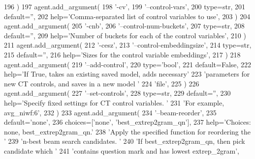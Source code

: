 \begin{DoxyCode}
196         )
197         agent.add\_argument(
198             \textcolor{stringliteral}{'-cv'},
199             \textcolor{stringliteral}{'--control-vars'},
200             type=str,
201             default=\textcolor{stringliteral}{''},
202             help=\textcolor{stringliteral}{'Comma-separated list of control variables to use'},
203         )
204         agent.add\_argument(
205             \textcolor{stringliteral}{'-cnb'},
206             \textcolor{stringliteral}{'--control-num-buckets'},
207             type=str,
208             default=\textcolor{stringliteral}{''},
209             help=\textcolor{stringliteral}{'Number of buckets for each of the control variables'},
210         )
211         agent.add\_argument(
212             \textcolor{stringliteral}{'-cesz'},
213             \textcolor{stringliteral}{'--control-embeddingsize'},
214             type=str,
215             default=\textcolor{stringliteral}{''},
216             help=\textcolor{stringliteral}{'Sizes for the control variable embeddings'},
217         )
218         agent.add\_argument(
219             \textcolor{stringliteral}{'--add-control'},
220             type=\textcolor{stringliteral}{'bool'},
221             default=\textcolor{keyword}{False},
222             help=\textcolor{stringliteral}{'If True, takes an existing saved model, adds necessary'}
223             \textcolor{stringliteral}{'parameters for new CT controls, and saves in a new model '}
224             \textcolor{stringliteral}{'file'},
225         )
226         agent.add\_argument(
227             \textcolor{stringliteral}{'--set-controls'},
228             type=str,
229             default=\textcolor{stringliteral}{''},
230             help=\textcolor{stringliteral}{'Specify fixed settings for CT control variables. '}
231             \textcolor{stringliteral}{'For example, avg\_niwf:6'},
232         )
233         agent.add\_argument(
234             \textcolor{stringliteral}{'--beam-reorder'},
235             default=\textcolor{stringliteral}{'none'},
236             choices=[\textcolor{stringliteral}{'none'}, \textcolor{stringliteral}{'best\_extrep2gram\_qn'}],
237             help=\textcolor{stringliteral}{'Choices: none, best\_extrep2gram\_qn.'}
238             \textcolor{stringliteral}{'Apply the specified function for reordering the '}
239             \textcolor{stringliteral}{'n-best beam search candidates. '}
240             \textcolor{stringliteral}{'If best\_extrep2gram\_qn, then pick candidate which '}
241             \textcolor{stringliteral}{'contains question mark and has lowest extrep\_2gram'},

\end{DoxyCode}
